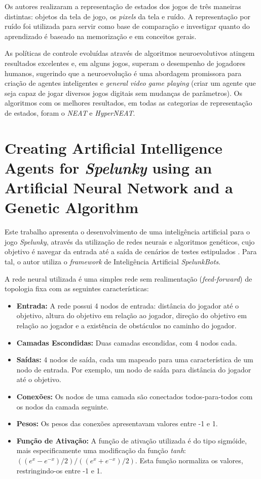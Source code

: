 Os autores realizaram a representação de estados dos jogos de três maneiras
distintas: objetos da tela de jogo, os \textit{pixels} da tela e ruído.  A
representação por ruído foi utilizada para servir como base de comparação e
investigar quanto do aprendizado é baseado na memorização e em conceitos gerais.

As políticas de controle evoluídas através de algoritmos neuroevolutivos atingem
resultados excelentes e, em alguns jogos, superam o desempenho de jogadores
humanos, sugerindo que a neuroevolução é uma abordagem promissora para criação
de agentes inteligentes e \textit{general video game playing} (criar um agente
que seja capaz de jogar diversos jogos digitais sem mudanças de parâmetros). Os
algoritmos com os melhores resultados, em todas as categorias de representação
de estados, foram o \textit{NEAT} e \textit{HyperNEAT}.


\section{Creating Artificial Intelligence Agents for \textit{Spelunky} using an
Artificial Neural Network and a Genetic Algorithm}
Este trabalho apresenta o desenvolvimento de uma inteligência artificial para o
jogo \textit{Spelunky}, através da utilização de redes neurais e algoritmos
genéticos, cujo objetivo é navegar da entrada até a saída de cenários de testes
estipulados \cite{spelunky_ann_genetic}. Para tal, o autor utiliza o
\textit{framework} de Inteligência Artificial \textit{SpelunkBots}.

A rede neural utilizada é uma simples rede sem realimentação
(\textit{feed-forward}) de topologia fixa com as seguintes características:

\begin{itemize}
	\item \textbf{Entrada:} A rede possui 4 nodos de entrada: distância do
		jogador até o objetivo, altura do objetivo em relação ao jogador,
		direção do objetivo em relação ao jogador e a existência de obstáculos
		no caminho do jogador.
	
	\item \textbf{Camadas Escondidas:} Duas camadas escondidas, com 4 nodos
		cada.

	\item \textbf{Saídas:} 4 nodos de saída, cada um mapeado para uma
		característica de um nodo de entrada. Por exemplo, um nodo de saída para
		distância do jogador até o objetivo.

	\item \textbf{Conexões:} Os nodos de uma camada são conectados
		todos-para-todos com os nodos da camada seguinte.

	\item \textbf{Pesos:} Os pesos das conexões apresentavam valores entre -1 e
		1.

	\item \textbf{Função de Ativação:} A função de ativação utilizada é do tipo
		sigmóide, mais especificamente uma modificação da função \textit{tanh}:
		$((e^{x} - e^{-x})/2) / ((e^{x} + e^{-x})/2)$. Esta função normaliza os
		valores, restringindo-os entre -1 e 1.
\end{itemize}

